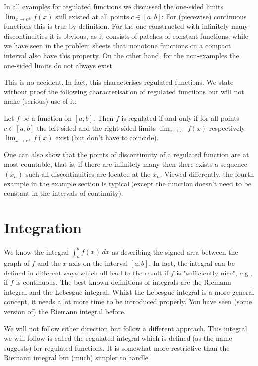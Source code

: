 \documentclass[10pt, a4paper]{article}
\begin{document}
In all examples for regulated functions we discussed the one-sided limits $\lim_{x \rightarrow c ^ {\pm}}f(x)$ still existed at all points $c \in [a, b]$:
For
(piecewise)
continuous functions this is true by definition.
For the one constructed with infinitely many discontinuities it is obvious,
as it consists of patches of constant functions,
while we have seen in the problem sheets that monotone functions on a compact interval also have this property.
On the other hand,
for the non-examples the one-sided limits do not  always exist

This is no accident.
In fact,
this characterises regulated functions.
We state without proof the following characterisation of regulated functions but will not make
(serious)
use of it:

\begin{theorem}
    Let $f$ be a function on $[a, b]$.
    Then $f$ is regulated if and only if for all points $c \in [a, b]$ the left-sided and the right-sided limits $\lim_{x \rightarrow c ^ {-}}f(x)$ respectively $\lim_{x \rightarrow c ^ {+}}f(x)$ exist
    (but don't have to coincide).
\end{theorem}

One can also show that the points of discontinuity of a regulated function are at most countable,
that is,
if there are infinitely many then there exists a sequence $(x_n)$ such all discontinuities are located at the $x_n$.
Viewed differently,
the fourth example in the example section is typical
(except the function doesn't need to be constant in the intervals of continuity).

\newpage

\section{Integration}
We know the integral $\int_{a}^{b}f(x)\,dx$ as describing the signed area between the graph of $f$ and the $x$-axis on the interval $[a, b]$.
In fact,
the integral can be defined in different ways which all lead to the result if $f$ is "sufficiently nice",
e.g.,
if $f$ is continuous.
The best known definitions of integrals are the Riemann integral and the Lebesgue integral.
Whilst the Lebesgue integral is a more general concept,
it needs a lot more time to be introduced properly.
You have seen
(some version of)
the Riemann integral before.

We will not follow either direction but follow a different approach.
This integral we will follow is called the regulated integral which is defined
(as the name suggests)
for regulated functions.
It is somewhat more restrictive than the Riemann integral but
(much)
simpler to handle.
\end{document}
